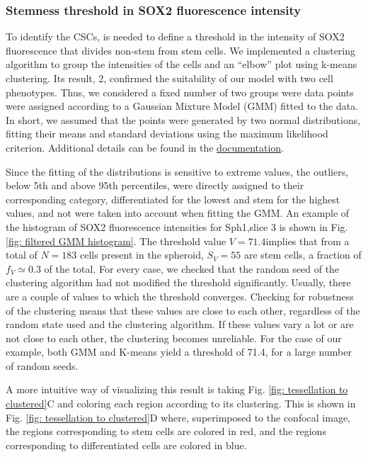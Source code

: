 \documentclass[fleqn,10pt]{wlscirep}
\begin{document}
\subsubsection*{Stemness threshold in SOX2 fluorescence intensity}

To identify the CSCs, is needed to define a threshold in the intensity of SOX2 fluorescence that divides non-stem from stem cells. We implemented a clustering algorithm to group the intensities of the cells and an ``elbow'' plot using k-means clustering. Its result, 2,  confirmed the suitability of our model with two cell phenotypes. Thus, we considered a fixed number of two groups were data points were assigned according to a Gaussian Mixture Model (GMM) fitted to the data. In short, we assumed that the points were generated by two normal distributions, fitting their means and standard deviations using the maximum likelihood criterion. Additional details can be found in the  \href{https://scikit-learn.org/stable/modules/generated/sklearn.mixture.GaussianMixture.html}{documentation}.

Since the fitting of the distributions is sensitive to extreme values, the outliers, below 5th and above 95th percentiles, were directly assigned to their corresponding category, differentiated for the lowest and stem for the highest values, and not were taken into account when fitting the GMM. An example of the histogram of SOX2 fluorescence intensities for \textsf{Sph1,slice 3} is shown in Fig. \ref{fig: filtered GMM histogram}. The threshold value $V=71.4$implies that from a total of $N=183$ cells present in the spheroid, $S_V=55$ are stem cells, a fraction of $f_V\simeq0.3$ of the total.
For every case, we checked that the random seed of the clustering algorithm had not modified the threshold significantly. Usually, there are a couple of values to which the threshold converges. Checking for robustness of the clustering means that these values are close to each other, regardless of the random state used and the clustering algorithm. If these values vary a lot or are not close to each other, the clustering becomes unreliable. For the case of our example, both GMM and K-means yield a threshold of 71.4, for a large number of random seeds.

A more intuitive way of visualizing this result is taking Fig. \ref{fig: tessellation to clustered}C and coloring each region according to its clustering. This is shown in Fig. \ref{fig: tessellation to clustered}D where, superimposed to the confocal image, the regions corresponding to stem cells are colored in red, and the regions corresponding to differentiated cells are colored in blue. 
\end{document}

